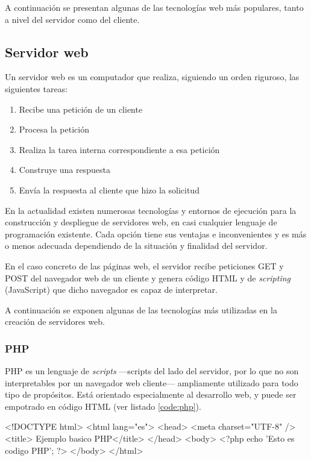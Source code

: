 A continuación se presentan algunas de las tecnologías web más populares, tanto a nivel del servidor como del cliente.

\subsection{Servidor web}

Un servidor web es un computador que realiza, siguiendo un orden riguroso, las siguientes tareas:

\begin{enumerate}
\item Recibe una petición de un cliente
\item Procesa la petición
\item Realiza la tarea interna correspondiente a esa petición
\item Construye una respuesta
\item Envía la respuesta al cliente que hizo la solicitud
\end{enumerate}

En la actualidad existen numerosas tecnologías y entornos de ejecución para la construcción y despliegue de servidores web, en casi cualquier lenguaje de programación existente. Cada opción tiene sus ventajas e inconvenientes y es más o menos adecuada dependiendo de la situación y finalidad del servidor.

En el caso concreto de las páginas web, el servidor recibe peticiones \acs{GET} y \acs{POST} del navegador web de un cliente y genera código \acs{HTML} y de {\it scripting} (JavaScript) que dicho navegador es capaz de interpretar.

A continuación se exponen algunas de las tecnologías más utilizadas en la creación de servidores web.

\subsubsection{PHP}

PHP es un lenguaje de {\it scripts} ---scripts del lado del servidor, por lo que no son interpretables por un navegador web cliente--- ampliamente utilizado para todo tipo de propósitos. Está orientado especialmente al desarrollo web, y puede ser empotrado en código \acs{HTML} (ver listado \ref{code:php}).

\begin{listing}[language=html, caption={Ejemplo de inclusión de código PHP en HTML}, label=code:php]
<!DOCTYPE html>
<html lang="es">
    <head>
        <meta charset="UTF-8" />
        <title> Ejemplo basico PHP</title>
    </head>
    <body>
        <?php
            echo 'Esto es codigo PHP';
        ?>
    </body>
</html>
\end{listing}

